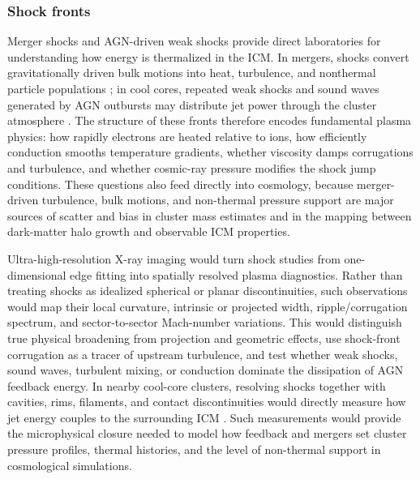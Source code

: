 \documentclass[fleqn,10pt]{SelfArx}
\begin{document}
\subsubsection{Shock fronts}
\label{shocks}

Merger shocks and AGN-driven weak shocks provide direct laboratories for understanding how energy is thermalized in the ICM. In mergers, shocks convert gravitationally driven bulk motions into heat, turbulence, and nonthermal particle populations \citep{MarkevitchVikhlinin2007,Russell2022,vanWeeren2019}; in cool cores, repeated weak shocks and sound waves generated by AGN outbursts may distribute jet power through the cluster atmosphere \citep{Fabian2003,Fabian2006,Forman2007,Randall2011,Randall2015}. The structure of these fronts therefore encodes fundamental plasma physics: how rapidly electrons are heated relative to ions, how efficiently conduction smooths temperature gradients, whether viscosity damps corrugations and turbulence, and whether cosmic-ray pressure modifies the shock jump conditions. These questions also feed directly into cosmology, because merger-driven turbulence, bulk motions, and non-thermal pressure support are major sources of scatter and bias in cluster mass estimates and in the mapping between dark-matter halo growth and observable ICM properties.

Ultra-high-resolution X-ray imaging would turn shock studies from one-dimensional edge fitting into spatially resolved plasma diagnostics. Rather than treating shocks as idealized spherical or planar discontinuities, such observations would map their local curvature, intrinsic or projected width, ripple/corrugation spectrum, and sector-to-sector Mach-number variations. This would distinguish true physical broadening from projection and geometric effects, use shock-front corrugation as a tracer of upstream turbulence, and test whether weak shocks, sound waves, turbulent mixing, or conduction dominate the dissipation of AGN feedback energy. In nearby cool-core clusters, resolving shocks together with cavities, rims, filaments, and contact discontinuities would directly measure how jet energy couples to the surrounding ICM \citep{Fabian2003,Birzan2004,McNamara2007,Randall2015}.
Such measurements would provide the microphysical closure needed to model how feedback and mergers set cluster pressure profiles, thermal histories, and the level of non-thermal support in cosmological simulations.
\end{document}
